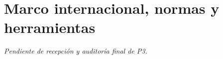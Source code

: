 \section{Marco internacional, normas y herramientas}

\textit{Pendiente de recepción y auditoría final de P3.}
